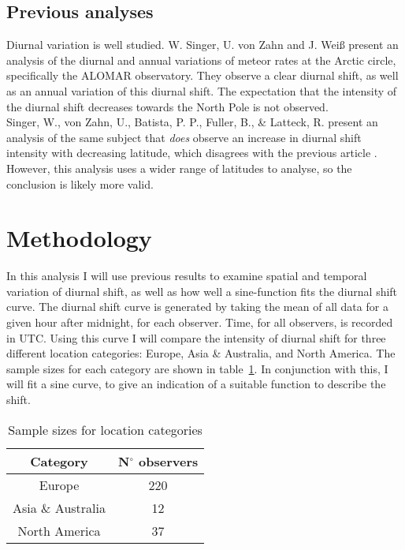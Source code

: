\subsection{Previous analyses}
\label{sec:dishift:litrev}
Diurnal variation is well studied. W. Singer, U. von Zahn and J. Wei{\ss} present an analysis \cite{alomar} of the diurnal and annual variations of meteor rates at the Arctic circle, specifically the ALOMAR observatory. They observe a clear diurnal shift, as well as an annual variation of this diurnal shift. The expectation that the intensity of the diurnal shift decreases towards the North Pole is not observed. \\
Singer, W., von Zahn, U., Batista, P. P., Fuller, B., \& Latteck, R. present an analysis \cite{latitudes} of the same subject that {\it does} observe an increase in diurnal shift intensity with decreasing latitude, which disagrees with the previous article \cite{alomar}. However, this analysis uses a wider range of latitudes to analyse, so the conclusion is likely more valid.
\section{Methodology}
In this analysis I will use previous results to examine spatial and temporal variation of diurnal shift, as well as how well a sine-function fits the diurnal shift curve.
The diurnal shift curve is generated by taking the mean of all data for a given hour after midnight, for each observer. Time, for all observers, is recorded in UTC. Using this curve I will compare the intensity of diurnal shift for three different location categories: Europe, Asia \& Australia, and North America. The sample sizes for each category are shown in table~\ref{tab:dishift:spatial}. In conjunction with this, I will fit a sine curve, to give an indication of a suitable function to describe the shift.
\begin{table}
	\begin{tabular}{cc}
		\hline
		Category & N$^{\circ}$ observers \\ \hline
		Europe & 220 \\
		Asia \& Australia & 12 \\
		North America & 37 \\
		\hline
	\end{tabular}
	\caption{Sample sizes for location categories
		\label{tab:dishift:spatial}}
\end{table}\\
